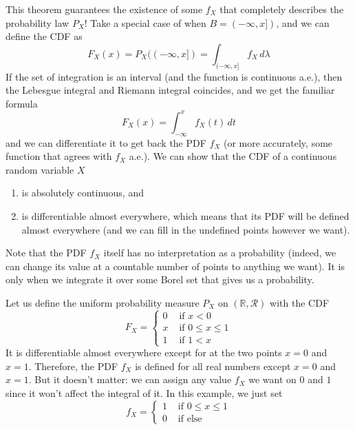 \documentclass{article}
\begin{document}
      This theorem guarantees the existence of some $f_X$ that completely describes the probability law $P_X$! Take a special case of when $B = (-\infty, x])$, and we can define the CDF as 
      \begin{equation}
        F_X (x) = P_X ((-\infty, x]) = \int_{(-\infty, x]} f_X \, d\lambda
      \end{equation}
      If the set of integration is an interval (and the function is continuous a.e.), then the Lebesgue integral and Riemann integral coincides, and we get the familiar formula 
      \begin{equation}
        F_X (x) = \int_{-\infty}^x f_X (t)\,dt
      \end{equation}
      and we can differentiate it to get back the PDF $f_X$ (or more accurately, some function that agrees with $f_X$ a.e.). We can show that the CDF of a continuous random variable $X$
      \begin{enumerate}
        \item is absolutely continuous, and 
        \item is differentiable almost everywhere, which means that its PDF will be defined almost everywhere (and we can fill in the undefined points however we want). 
      \end{enumerate}
      Note that the PDF $f_X$ itself has no interpretation as a probability (indeed, we can change its value at a countable number of points to anything we want). It is only when we integrate it over some Borel set that gives us a probability. 

      \begin{example}
        Let us define the uniform probability measure $P_X$ on $(\mathbb{R}, \mathcal{R})$ with the CDF 
        \begin{equation}
          F_X = \begin{cases} 0 & \text{ if } x < 0 \\
          x & \text{ if } 0 \leq x \leq 1 \\
          1 & \text{ if } 1 < x \end{cases}
        \end{equation}
        It is differentiable almost everywhere except for at the two points $x = 0$ and $x = 1$. Therefore, the PDF $f_X$ is defined for all real numbers except $x = 0$ and $x = 1$. But it doesn't matter: we can assign any value $f_X$ we want on $0$ and $1$ since it won't affect the integral of it. In this example, we just set 
        \begin{equation}
          f_X = \begin{cases} 1 & \text{ if } 0 \leq x \leq 1 \\
          0 & \text{ if else} \end{cases} 
        \end{equation}
      \end{example}
\end{document}
